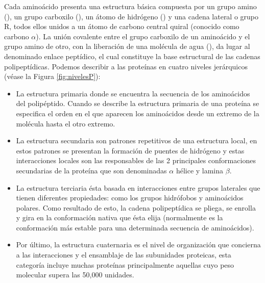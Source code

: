 Cada aminoácido presenta una estructura básica compuesta por un grupo amino (), un grupo carboxilo (), un átomo de hidrógeno () y una cadena lateral o grupo R, todos ellos unidos a un átomo de carbono central quiral (conocido como carbono \(\alpha\)). La unión covalente entre el grupo carboxilo de un aminoácido y el grupo amino de otro, con la liberación de una molécula de agua (), da lugar al denominado enlace peptídico, el cual constituye la base estructural de las cadenas polipeptídicas. Podemos describir a las prote\'{i}nas en cuatro niveles jer\'{a}rquicos (véase la Figura \ref{fig:nivelesP}):

\begin{itemize}

\item La estructura primaria donde se encuentra la secuencia de los
amino\'{a}cidos del polip\'{e}ptido. Cuando se describe la estructura primaria de una prote\'{i}na se especiﬁca el
orden en el que aparecen los amino\'{a}cidos desde un extremo de la mol\'{e}cula hasta el otro extremo.

\item La estructura secundaria son patrones repetitivos de una estructura local, en estos
patrones se presentan la formaci\'{o}n de puentes de hidr\'{o}geno y estas interacciones locales son las
responsables de las 2 principales conformaciones secundarias de la prote\'{i}na que son denominadas $\alpha$ h\'{e}lice y lamina $\beta$.


\item La estructura terciaria \'{e}sta basada en interacciones entre grupos laterales que tienen diferentes
propiedades: como los grupos hidr\'{o}fobos y amino\'{a}cidos polares. Como resultado de esto, la cadena
polipept\'{i}dica se pliega, se enrolla y gira en la conformaci\'{o}n nativa que ésta elija (normalmente es la conformaci\'{o}n m\'{a}s estable para una determinada secuencia de amino\'{a}cidos).


\item Por último, la estructura cuaternaria es el nivel de organizaci\'{o}n que concierna a las interacciones y el ensamblaje de las subunidades proteicas, esta categor\'{i}a incluye muchas prote\'{i}nas principalmente aquellas cuyo peso molecular supera las 50,000 unidades.

\end{itemize}

